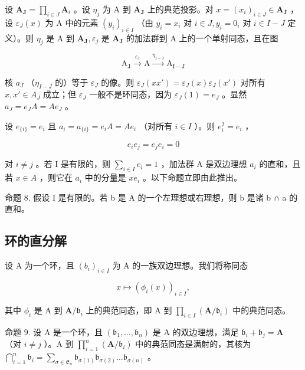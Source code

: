 设 \(\mathbf{A}_{\mathbf{J}} = \prod_{i\in J}\mathbf{A}_i\) 。设 \(\eta_{j}\) 为 A 到 \(\mathbf{A}_{\mathbf{J}}\) 上的典范投影。对 \(x = (x_{i})_{i\in J}\in \mathbf{A}_{\mathbf{J}}\) ，设 \(\varepsilon_{J}(x)\) 为 A 中的元素 \((y_{i})_{i\in I}\) （由 \(y_{i} = x_{i}\) 对 \(i\in J, y_{i} = 0_{i}\) 对 \(i\in I - J\) 定义）。则 \(\eta_{j}\) 是 A 到 \(\mathbf{A}_{\mathbf{J}},\varepsilon_{j}\) 是 \(\mathbf{A}_{\mathbf{J}}\) 的加法群到 A 上的一个单射同态，且在图

\[
\mathrm{A} _ {\mathrm{J}} \xrightarrow {\varepsilon_ {\mathrm{J}}} \mathrm{A} \xrightarrow {\eta_ {\mathrm{I} - \mathrm{J}}} \mathrm{A} _ {\mathrm{I} - \mathrm{J}}
\]

核 \(a_{J}\) （\(\eta_{I-J}\) 的）等于 \(\varepsilon_{J}\) 的像。则 \(\varepsilon_{J}(xx') = \varepsilon_{J}(x)\varepsilon_{J}(x')\) 对所有 \(x, x' \in A_{J}\) 成立；但 \(\varepsilon_{J}\) 一般不是环同态，因为 \(\varepsilon_{J}(1) = e_{J}\) 。显然 \(a_{J} = e_{J}A = Ae_{J}\) 。

设 \(e_{\{i\}} = e_i\) 且 \(a_i = a_{\{i\}} = e_i A = Ae_i\) （对所有 \(i \in I\) ）。则 \(e_i^2 = e_i\) ，

\[
e _ {i} e _ {j} = e _ {j} e _ {i} = 0
\]

对 \(i \neq j\) 。若 I 是有限的，则 \(\sum_{i \in I} e_i = 1\) ，加法群 A 是双边理想 \(a_i\) 的直和，且若 \(x \in A\) ，则它在 \(a_i\) 中的分量是 \(xe_i\) 。以下命题立即由此推出。

命题 8. 假设 I 是有限的。若 b 是 A 的一个左理想或右理想，则 b 是诸 b ∩ a 的直和。

\subsection{环的直分解}

设 A 为一个环，且 \((b_{i})_{i\in I}\) 为 A 的一族双边理想。我们将称同态

\[
x \mapsto (\phi_ {i} (x)) _ {i \in I},
\]

其中 \(\phi_{i}\) 是 A 到 \(\mathbf{A} / \mathfrak{b}_i\) 上的典范同态，即 A 到 \(\prod_{i\in I}(\mathbf{A} / \mathfrak{b}_i)\) 中的典范同态。

命题 9. 设 A 是一个环，且 \((\mathfrak{b}_1, \ldots, \mathfrak{b}_n)\) 是 A 的双边理想，满足 \(\mathfrak{b}_i + \mathfrak{b}_j = \mathbf{A}\) （对 \(i \neq j\) ）。A 到 \(\prod_{i=1}^{n} (\mathbf{A} / \mathfrak{b}_i)\) 中的典范同态是满射的，其核为 \(\bigcap_{i=1}^{n} \mathfrak{b}_i = \sum_{\sigma \in \mathfrak{E}_n} \mathfrak{b}_{\sigma(1)} \mathfrak{b}_{\sigma(2)} \ldots \mathfrak{b}_{\sigma(n)}\) 。

